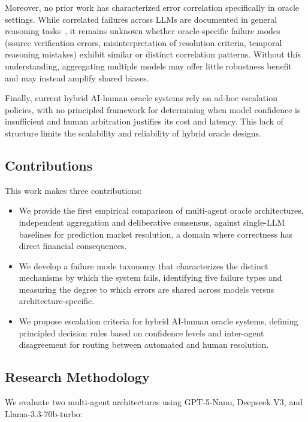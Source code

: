 Moreover, no prior work has characterized error correlation specifically in oracle settings. While correlated failures across LLMs are documented in general reasoning tasks~\cite{kim2025correlated}, it remains unknown whether oracle-specific failure modes (source verification errors, misinterpretation of resolution criteria, temporal reasoning mistakes) exhibit similar or distinct correlation patterns. Without this understanding, aggregating multiple models may offer little robustness benefit and may instead amplify shared biases.

Finally, current hybrid AI-human oracle systems rely on ad-hoc escalation policies, with no principled framework for determining when model confidence is insufficient and human arbitration justifies its cost and latency. This lack of structure limits the scalability and reliability of hybrid oracle designs.

\subsection{Contributions}

This work makes three contributions:

\begin{itemize}
    \item We provide the first empirical comparison of multi-agent oracle architectures, independent aggregation and deliberative consensus, against single-LLM baselines for prediction market resolution, a domain where correctness has direct financial consequences.
    
    \item We develop a failure mode taxonomy that characterizes the distinct 
mechanisms by which the system fails, identifying five failure types and 
measuring the degree to which errors are shared across models versus 
architecture-specific.
    
    \item We propose escalation criteria for hybrid AI-human oracle systems, defining principled decision rules based on confidence levels and inter-agent disagreement for routing between automated and human resolution.
\end{itemize}

\subsection{Research Methodology}

We evaluate two multi-agent architectures using GPT-5-Nano, Deepseek V3, and Llama-3.3-70b-turbo:

